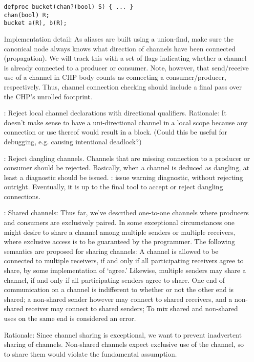 \begin{verbatim}
defproc bucket(chan?(bool) S) { ... }
chan(bool) R;
bucket a(R), b(R);
\end{verbatim}

Implementation detail: 
As aliases are built using a union-find, make sure the canonical node
always knows what direction of channels have been connected (propagation).  
We will track this with a set of flags indicating whether a channel
is already connected to a producer or consumer.  
Note, however, that send/receive use of a channel in CHP body counts as 
connecting a consumer/producer, respectively.  
Thus, channel connection checking should include a final pass over
the CHP's unrolled footprint.  

: 
Reject local channel declarations with directional qualifiers.  
Rationale: It doesn't make sense to have a uni-directional channel
in a local scope because any connection or use thereof would result
in a block.  
(Could this be useful for debugging, e.g. causing intentional deadlock?)

: Reject dangling channels.  
Channels that are missing connection to a producer or consumer
should be rejected.  Basically, when a channel is deduced as dangling, 
at least a diagnostic should be issued.  
: issue warning diagnostic, without rejecting outright.
Eventually, it is up to the final tool to accept or reject dangling
connections.  

: Shared channels:
Thus far, we've described one-to-one channels where producers
and consumers are exclusively paired.  
In some exceptional circumstances one might desire to share a 
channel among multiple senders or multiple receivers, 
where exclusive access is to be guaranteed by the programmer.  
The following semantics are proposed for sharing channels:
A channel is allowed to be connected to multiple receivers, if and only if
all participating receivers agree to share, 
by some implementation of `agree.'
Likewise, multiple senders may share a channel, if and only if
all participating senders agree to share.  
One end of communication on a channel is indifferent
to whether or not the other end is shared; 
a non-shared sender however may connect to shared receivers, 
and a non-shared receiver may connect to shared senders;
To mix shared and non-shared uses on the same end is considered
an error.  

Rationale: Since channel sharing is exceptional, we want to prevent
inadvertent sharing of channels.  Non-shared channels expect 
exclusive use of the channel, so to share them would violate
the fundamental assumption.  

